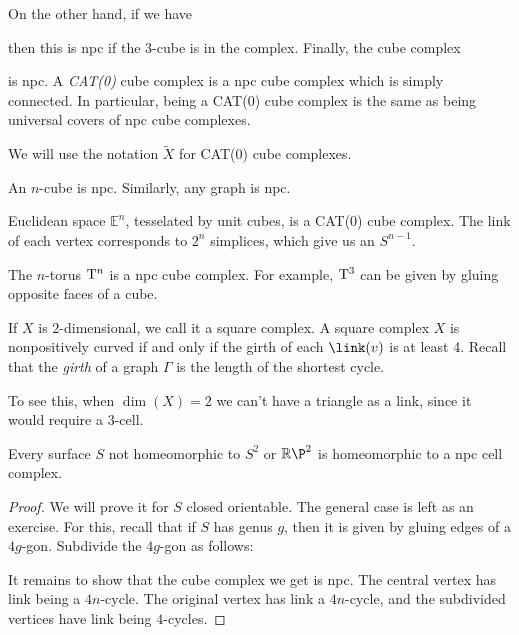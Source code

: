 \documentclass{article}
\begin{document}
On the other hand, if we have

then this is npc if the \(3\)-cube is in the complex. Finally, the cube complex

is npc. A \emph{CAT(0)} cube complex is a npc cube complex which is simply connected. In particular, being a CAT(0) cube complex is the same as being universal covers of npc cube complexes.

We will use the notation \(\widetilde X\) for CAT(0) cube complexes.

\begin{example}
    An \(n\)-cube is npc. Similarly, any graph is npc. 
    
    Euclidean space \(\mathbb E^n\), tesselated by unit cubes, is a CAT(0) cube complex. The link of each vertex corresponds to \(2^n\) simplices, which give us an \(S^{n-1}\).
\end{example}

\begin{example}
    The \(n\)-torus \(\mathrm{T}^n\) is a npc cube complex. For example, \(\mathrm{T}^3\) can be given by gluing opposite faces of a cube.
\end{example}

\begin{remark}
    If \(X\) is \(2\)-dimensional, we call it a square complex. A square complex \(X\) is nonpositively curved if and only if the girth of each \(\link(v)\) is at least 4. Recall that the \emph{girth} of a graph \(\Gamma\) is the length of the shortest cycle.

    To see this, when \(\dim(X) = 2\) we can't have a triangle as a link, since it would require a \(3\)-cell.
\end{remark}

\begin{theorem}
    Every surface \(S\) not homeomorphic to \(S^2\) or \(\R\P^2\) is homeomorphic to a npc cell complex.
\end{theorem}

\begin{proof}
    We will prove it for \(S\) closed orientable. The general case is left as an exercise. For this, recall that if \(S\) has genus \(g\), then it is given by gluing edges of a \(4g\)-gon. Subdivide the \(4g\)-gon as follows:

    It remains to show that the cube complex we get is npc. The central vertex has link being a \(4n\)-cycle. The original vertex has link a \(4n\)-cycle, and the subdivided vertices have link being \(4\)-cycles.
\end{proof}
\end{document}
